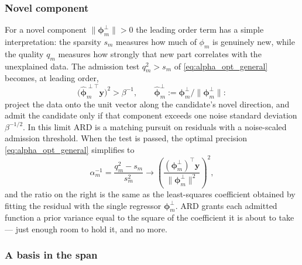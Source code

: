 \documentclass[a4paper]{article}
\renewcommand{\vec}[1]{\boldsymbol{#1}}
\begin{document}
\subsubsection*{Novel component}
For a novel component $\|\vec \phi_m^\perp\| > 0$ the leading order term has a simple interpretation: the sparsity $s_m$ measures how much of $\phi_m$ is genuinely new, while the quality $q_m$ measures how strongly that new part correlates with the unexplained data. The admission test $q_m^2 > s_m$ of \eqref{eq:alpha_opt_general} becomes, at leading order,
\begin{equation} \label{eq:test_low_noise}
    \big( \hat{\vec \phi}_m^{\perp \top} \mathbf y \big)^2 > \beta^{-1},
    \qquad
    \hat{\vec \phi}_m^\perp := \vec \phi_m^\perp / \|\vec \phi_m^\perp\|:
\end{equation}
project the data onto the unit vector along the candidate's novel direction, and admit the candidate only if that component exceeds one noise standard deviation $\beta^{-1/2}$. In this limit ARD is a matching pursuit on residuals with a noise-scaled admission threshold. When the test is passed, the optimal precision \eqref{eq:alpha_opt_general} simplifies to
\begin{equation} \label{eq:alpha_low_noise}
    \alpha_m^{-1} = \frac{q_m^2 - s_m}{s_m^2} \to \left( \frac{(\vec \phi_m^\perp)^\top \mathbf y}{\|\vec \phi_m^\perp\|^2} \right)^{\!2},
\end{equation}
and the ratio on the right is the same as the least-squares coefficient obtained by fitting the residual with the single regressor $\vec \phi_m^\perp$. ARD grants each admitted function a prior variance equal to the square of the coefficient it is about to take --- just enough room to hold it, and no more.

\subsubsection*{A basis in the span} \label{sec:in_span}
\end{document}
